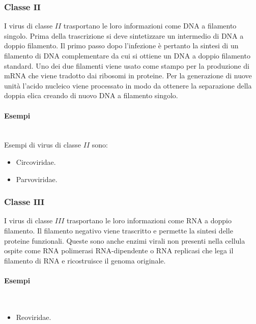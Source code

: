		\subsubsection{Classe $\mathbf{II}$}
		I virus di classe $II$ trasportano le loro informazioni come DNA a filamento singolo.
		Prima della trascrizione si deve sintetizzare un intermedio di DNA a doppio filamento.
		Il primo passo dopo l'infezione \`e pertanto la sintesi di un filamento di DNA complementare da cui si ottiene un DNA a doppio filamento standard.
		Uno dei due filamenti viene usato come stampo per la produzione di mRNA che viene tradotto dai ribosomi in proteine.
		Per la generazione di nuove unit\`a l'acido nucleico viene processato in modo da ottenere la separazione della doppia elica creando di nuovo DNA a filamento singolo.

			\paragraph{Esempi}\mbox{}\\
			Esempi di virus di classe $II$ sono:
			\begin{multicols}{2}
				\begin{itemize}
					\item Circoviridae.
					\item Parvoviridae.
				\end{itemize}
			\end{multicols}

		\subsubsection{Classe $\mathbf{III}$}
		I virus di classe $III$ trasportano le loro informazioni come RNA a doppio filamento.
		Il filamento negativo viene trascritto e permette la sintesi delle proteine funzionali.
		Queste sono anche enzimi virali non presenti nella cellula ospite come RNA polimerasi RNA-dipendente o RNA replicasi che lega il filamento di RNA e ricostruisce il genoma originale.

			\paragraph{Esempi}\mbox{}\\
			\begin{center}
				\begin{itemize}
					\item Reoviridae.
				\end{itemize}
			\end{center}

